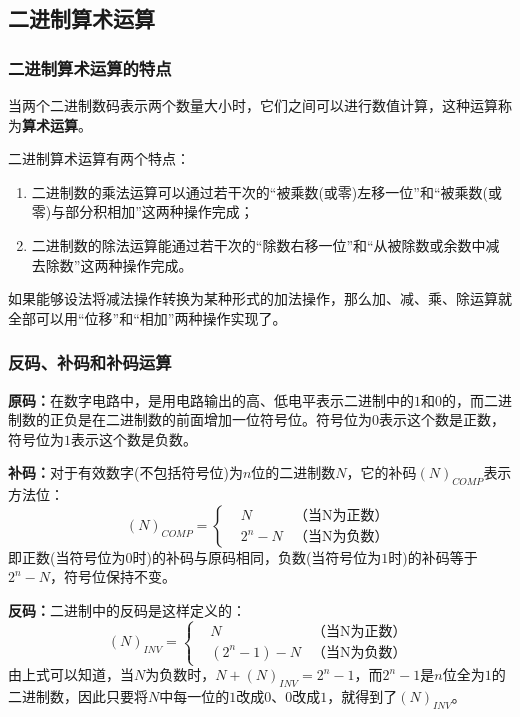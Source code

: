 \subsection{二进制算术运算}

\subsubsection{二进制算术运算的特点}

当两个二进制数码表示两个数量大小时，它们之间可以进行数值计算，这种运算称为\textbf{算术运算}。

二进制算术运算有两个特点：
\begin{enumerate}
    \item 二进制数的乘法运算可以通过若干次的“被乘数(或零)左移一位”和“被乘数(或零)与部分积相加”这两种操作完成；
    \item 二进制数的除法运算能通过若干次的“除数右移一位”和“从被除数或余数中减去除数”这两种操作完成。
\end{enumerate}

如果能够设法将减法操作转换为某种形式的加法操作，那么加、减、乘、除运算就全部可以用“位移”和“相加”两种操作实现了。

\subsubsection{反码、补码和补码运算}
\textbf{原码：}在数字电路中，是用电路输出的高、低电平表示二进制中的$ 1 $和$ 0 $的，而二进制数的正负是在二进制数的前面增加一位符号位。符号位为$ 0 $表示这个数是正数，符号位为$ 1 $表示这个数是负数。

\textbf{补码：}对于有效数字(不包括符号位)为$ n $位的二进制数$ N $，它的补码$ \left( N \right)_{COMP} $表示方法位：
\begin{equation}
    \left( N \right)_{COMP} =
    \left\{
    \begin{aligned}
         & N \qquad  & \text{（当N为正数）} \\
         & 2^{n} - N & \text{（当N为负数）}
    \end{aligned}
    \right.
    \label{二进制补码}
\end{equation}
即正数(当符号位为$ 0 $时)的补码与原码相同，负数(当符号位为$ 1 $时)的补码等于$ 2^{n} - N $，符号位保持不变。

\textbf{反码：}二进制中的反码是这样定义的：
\begin{equation}
    \left( N \right)_{INV} =
    \left\{
    \begin{aligned}
         & N \qquad                     & \text{（当N为正数）} \\
         & \left( 2^{n} - 1 \right) - N & \text{（当N为负数）}
    \end{aligned}
    \right.
    \label{二进制反码}
\end{equation}
由上式可以知道，当$ N $为负数时，$ N + \left( N \right)_{INV} = 2^{n} - 1 $，而$ 2^{n} - 1 $是$ n $位全为$ 1 $的二进制数，因此只要将$ N $中每一位的$ 1 $改成$ 0 $、$ 0 $改成$ 1 $，就得到了$ \left( N \right)_{INV} $。

